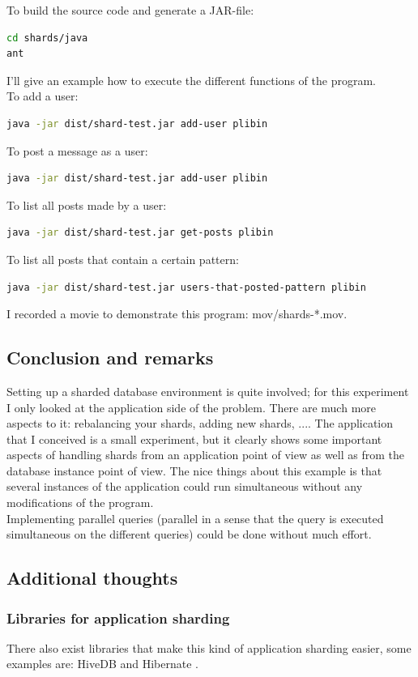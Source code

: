 \documentclass[12pt]{report}
\begin{document}
To build the source code and generate a JAR-file:
\begin{lstlisting}[language=bash]
cd shards/java
ant
\end{lstlisting}

I'll give an example how to execute the different functions of the
program.\\
To add a user:
\begin{lstlisting}[language=bash]
java -jar dist/shard-test.jar add-user plibin
\end{lstlisting}
To post a message as a user:
\begin{lstlisting}[language=bash]
java -jar dist/shard-test.jar add-user plibin
\end{lstlisting}
To list all posts made by a user:
\begin{lstlisting}[language=bash]
java -jar dist/shard-test.jar get-posts plibin
\end{lstlisting}
To list all posts that contain a certain pattern:
\begin{lstlisting}[language=bash]
java -jar dist/shard-test.jar users-that-posted-pattern plibin
\end{lstlisting}

I recorded a movie to demonstrate this program: mov/shards-*.mov.

\subsection{Conclusion and remarks}
Setting up a sharded database environment is quite involved; for this experiment I only
looked at the application side of the problem. There are much more
aspects to it: rebalancing your shards, adding new shards, ....
The application that I conceived is a small experiment, but it clearly
shows some important aspects of handling shards from an application
point of view as well as from the database instance point of view.
The nice things about this example is that several instances of the
application could run simultaneous without any modifications of the
program.\\
Implementing parallel queries (parallel in a sense that the query is
executed simultaneous on the different queries) could be done without
much effort.

\subsection{Additional thoughts}
\subsubsection{Libraries for application sharding}
There also exist libraries that make this kind
of application sharding easier, some examples are: HiveDB
\cite{hivedb} and Hibernate \cite{hibernate_tenants}.
\end{document}
